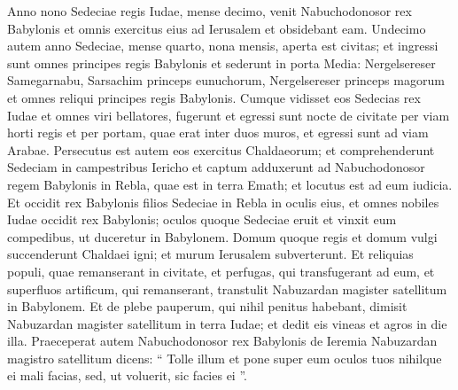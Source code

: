 \begin{biblechapter}
\begin{biblechapter}
\begin{biblechapter}
\begin{biblechapter}
\begin{biblechapter}
\begin{biblechapter}
\begin{biblechapter}
\begin{biblechapter}
\begin{biblechapter}
\begin{biblechapter}
\begin{biblechapter}
\begin{biblechapter}
\begin{biblechapter}
\begin{biblechapter}
\begin{biblechapter}
\begin{biblechapter}
\begin{biblechapter}
\begin{biblechapter}
\begin{biblechapter}
\begin{biblechapter}
\begin{biblechapter}
\begin{biblechapter}
\begin{biblechapter}
\begin{biblechapter}
\begin{biblechapter}
\begin{biblechapter}
\begin{biblechapter}
\begin{biblechapter}
\begin{biblechapter}
\begin{biblechapter}
\begin{biblechapter}
\begin{biblechapter}
\begin{biblechapter}
\begin{biblechapter}
\begin{biblechapter}
\begin{biblechapter}
\begin{biblechapter}
\begin{biblechapter}
\begin{biblechapter}
\verse Anno nono Sedeciae regis Iudae, mense decimo, venit Nabuchodonosor rex Babylonis et omnis exercitus eius ad Ierusalem et obsidebant eam. 
\verse Undecimo autem anno Sedeciae, mense quarto, nona mensis, aperta est civitas; 
\verse et ingressi sunt omnes principes regis Babylonis et sederunt in porta Media: Nergelsereser Samegarnabu, Sarsachim princeps eunuchorum, Nergelsereser princeps magorum et omnes reliqui principes regis Babylonis.
 \verse Cumque vidisset eos Sedecias rex Iudae et omnes viri bellatores, fugerunt et egressi sunt nocte de civitate per viam horti regis et per portam, quae erat inter duos muros, et egressi sunt ad viam Arabae. 
\verse Persecutus est autem eos exercitus Chaldaeorum; et comprehenderunt Sedeciam in campestribus Iericho et captum adduxerunt ad Nabuchodonosor regem Babylonis in Rebla, quae est in terra Emath; et locutus est ad eum iudicia.
 \verse Et occidit rex Babylonis filios Sedeciae in Rebla in oculis eius, et omnes nobiles Iudae occidit rex Babylonis; 
\verse oculos quoque Sedeciae eruit et vinxit eum compedibus, ut duceretur in Babylonem. 
\verse Domum quoque regis et domum vulgi succenderunt Chaldaei igni; et murum Ierusalem subverterunt. 
\verse Et reliquias populi, quae remanserant in civitate, et perfugas, qui transfugerant ad eum, et superfluos artificum, qui remanserant, transtulit Nabuzardan magister satellitum in Babylonem. 
\verse Et de plebe pauperum, qui nihil penitus habebant, dimisit Nabuzardan magister satellitum in terra Iudae; et dedit eis vineas et agros in die illa.
 \verse Praeceperat autem Nabuchodonosor rex Babylonis de Ieremia Nabuzardan magistro satellitum dicens: 
\verse “ Tolle illum et pone super eum oculos tuos nihilque ei mali facias, sed, ut voluerit, sic facies ei ”. 

\end{biblechapter}
\end{biblechapter}
\end{biblechapter}
\end{biblechapter}
\end{biblechapter}
\end{biblechapter}
\end{biblechapter}
\end{biblechapter}
\end{biblechapter}
\end{biblechapter}
\end{biblechapter}
\end{biblechapter}
\end{biblechapter}
\end{biblechapter}
\end{biblechapter}
\end{biblechapter}
\end{biblechapter}
\end{biblechapter}
\end{biblechapter}
\end{biblechapter}
\end{biblechapter}
\end{biblechapter}
\end{biblechapter}
\end{biblechapter}
\end{biblechapter}
\end{biblechapter}
\end{biblechapter}
\end{biblechapter}
\end{biblechapter}
\end{biblechapter}
\end{biblechapter}
\end{biblechapter}
\end{biblechapter}
\end{biblechapter}
\end{biblechapter}
\end{biblechapter}
\end{biblechapter}
\end{biblechapter}
\end{biblechapter}
